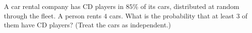 A car rental company has CD players in $85\%$ of its cars, distributed at random through the fleet. A person rents $4$ cars. What is the probability that at least $3$ of them have CD players? (Treat the cars as independent.)
